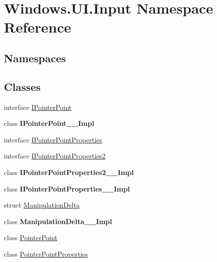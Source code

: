 \hypertarget{namespace_windows_1_1_u_i_1_1_input}{}\section{Windows.\+U\+I.\+Input Namespace Reference}
\label{namespace_windows_1_1_u_i_1_1_input}
\subsection*{Namespaces}
\begin{DoxyCompactItemize}
\end{DoxyCompactItemize}
\subsection*{Classes}
\begin{DoxyCompactItemize}
\item 
interface \hyperlink{interface_windows_1_1_u_i_1_1_input_1_1_i_pointer_point}{I\+Pointer\+Point}
\item 
class {\bfseries I\+Pointer\+Point\+\_\+\+\_\+\+Impl}
\item 
interface \hyperlink{interface_windows_1_1_u_i_1_1_input_1_1_i_pointer_point_properties}{I\+Pointer\+Point\+Properties}
\item 
interface \hyperlink{interface_windows_1_1_u_i_1_1_input_1_1_i_pointer_point_properties2}{I\+Pointer\+Point\+Properties2}
\item 
class {\bfseries I\+Pointer\+Point\+Properties2\+\_\+\+\_\+\+Impl}
\item 
class {\bfseries I\+Pointer\+Point\+Properties\+\_\+\+\_\+\+Impl}
\item 
struct \hyperlink{struct_windows_1_1_u_i_1_1_input_1_1_manipulation_delta}{Manipulation\+Delta}
\item 
class {\bfseries Manipulation\+Delta\+\_\+\+\_\+\+Impl}
\item 
class \hyperlink{class_windows_1_1_u_i_1_1_input_1_1_pointer_point}{Pointer\+Point}
\item 
class \hyperlink{class_windows_1_1_u_i_1_1_input_1_1_pointer_point_properties}{Pointer\+Point\+Properties}
\end{DoxyCompactItemize}

